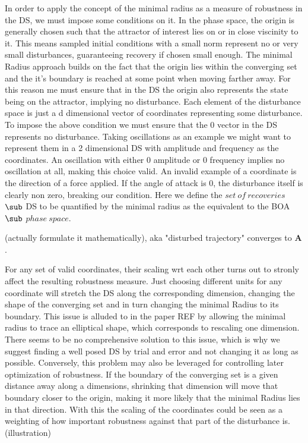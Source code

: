     In order to apply the concept of the minimal radius as a measure of robustness in the DS, we must impose some conditions on it.
    In the phase space, the origin is generally chosen such that the attractor of interest lies on or in close viscinity to it. This means sampled initial conditions with a small norm represent no or very small disturbances, guaranteeing recovery if chosen small enough. The minimal Radius approach builds on the fact that the origin lies within the converging set and the it's boundary is reached at some point when moving farther away. 
    For this reason me must ensure that in the DS the origin also represents the state being on the attractor, implying no disturbance.
    Each element of the disturbance space is just a d dimensional vector of coordinates representing some disturbance. To impose the above condition we must ensure that the 0 vector in the DS represents no disturbance. 
    Taking oscillations as an example we might want to represent them in a 2 dimensional DS with amplitude and frequency as the coordinates. An oscillation with either 0 amplitude or 0 frequency implies no oscillation at all, making this choice valid.
    An invalid example of a coordinate is the direction of a force applied. If the angle of attack is 0, the disturbance itself is clearly non zero, breaking our condition.
    Here we define the $set\ of\ recoveries$ $\sub$ DS to be quantified by the minimal radius as the equivalent to the BOA $\sub$ $phase\ space$.

    (actually formulate it mathematically), aka "disturbed trajectory" converges to $\mathbf{A}$.


    For any set of valid coordinates, their scaling wrt each other turns out to stronly affect the resulting robustness measure. Just choosing different units for any coordinate will stretch the DS along the corresponding dimension, changing the shape of the converging set and in turn changing the minimal Radius to its boundary. This issue is alluded to in the paper REF by allowing the minimal radius to trace an elliptical shape, which corresponds to rescaling one dimension. There seems to be no comprehensive solution to this issue, which is why we suggest finding a well posed DS by trial and error and not changing it as long as possible. 
    Conversely, this problem may also be leveraged for controlling later optimization of robustness. If the boundary of the converging set is a given distance away along a dimensions, shrinking that dimension will move that boundary closer to the origin, making it more likely that the minimal Radius lies in that direction. With this the scaling of the coordinates could be seen as a weighting of how important robustness against that part of the disturbance is. 
    (illustration)

